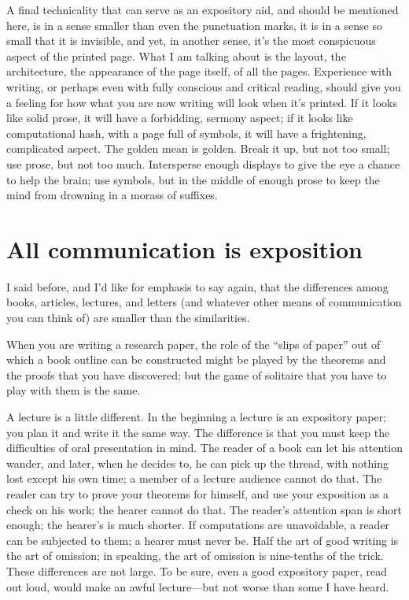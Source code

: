 \documentclass[12pt]{article}
\begin{document}
A final technicality that can serve as an expository aid, and should be mentioned here, is in a sense smaller than even the punctuation marks, it is in a sense so small that it is invisible, and yet, in another sense, it's the most conspicuous aspect of the printed page. What I am talking about is the layout, the architecture, the appearance of the page itself, of all the pages. Experience with writing, or perhaps even with fully conscious and critical reading, should give you a feeling for how what you are now writing will look when it's printed. If it looks like solid prose, it will have a forbidding, sermony aspect; if it looks like computational hash, with a page full of symbols, it will have a frightening, complicated aspect. The golden mean is golden. Break it up, but not too small; use prose, but not too much. Intersperse enough displays to give the eye a chance to help the brain; use symbols, but in the middle of enough prose to keep the mind from drowning in a morass of suffixes. 

\section{All communication is exposition}

I said before, and I'd like for emphasis to say again, that the differences among books, articles, lectures, and letters (and whatever other means of communication you can think of) are smaller than the similarities. 

When you are writing a research paper, the role of the ``slips of paper'' out of which a book outline can be constructed might be played by the theorems and the proofs that you have discovered; but the game of solitaire that you have to play with them is the same. 

A lecture is a little different. In the beginning a lecture is an expository paper; you plan it and write it the same way. The difference is that you must keep the difficulties of oral presentation in mind. The reader of a book can let his attention wander, and later, when he decides to, he can pick up the thread, with nothing lost except his own time; a member of a lecture audience cannot do that. The reader can try to prove your theorems for himself, and use your exposition as a check on his work; the hearer cannot do that. The reader's attention span is short enough; the hearer's is much shorter. If computations are unavoidable, a reader can be subjected to them; a hearer must never be. Half the art of good writing is the art of omission; in speaking, the art of omission is nine-tenths of the trick. These differences are not large. To be sure, even a good expository paper, read out loud, would make an awful lecture---but not worse than some I have heard. 
\end{document}
